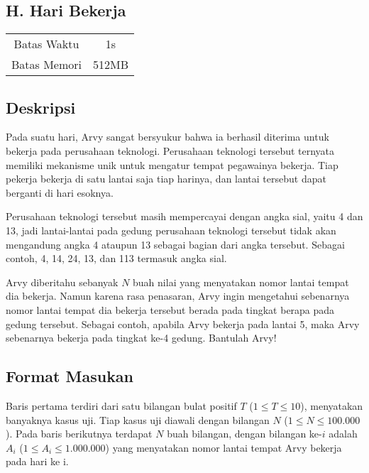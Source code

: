 \documentclass{article}
\begin{document}
\begin{center}
    \section*{H. Hari Bekerja}

    \begin{tabular}{ | c c | }
        \hline
        Batas Waktu  & 1s \\
        Batas Memori & 512MB \\
        \hline
    \end{tabular}
\end{center}

\subsection*{Deskripsi}

Pada suatu hari, Arvy sangat bersyukur bahwa ia berhasil diterima untuk bekerja pada perusahaan teknologi.
Perusahaan teknologi tersebut ternyata memiliki mekanisme unik untuk mengatur tempat pegawainya bekerja.
Tiap pekerja bekerja di satu lantai saja tiap harinya, dan lantai tersebut dapat berganti di hari esoknya.

Perusahaan teknologi tersebut masih mempercayai dengan angka sial, yaitu 4 dan 13, jadi lantai-lantai pada gedung perusahaan teknologi tersebut tidak akan mengandung angka 4 ataupun 13 sebagai bagian dari angka tersebut.
Sebagai contoh, 4, 14, 24, 13, dan 113 termasuk angka sial.

Arvy diberitahu sebanyak $N$ buah nilai yang menyatakan nomor lantai tempat dia bekerja.
Namun karena rasa penasaran, Arvy ingin mengetahui sebenarnya nomor lantai tempat dia bekerja tersebut berada pada tingkat berapa pada gedung tersebut.
Sebagai contoh, apabila Arvy bekerja pada lantai 5, maka Arvy sebenarnya bekerja pada tingkat ke-4 gedung.
Bantulah Arvy!

\subsection*{Format Masukan}

Baris pertama terdiri dari satu bilangan bulat positif $T$ ($1 \leq T \leq 10$), menyatakan banyaknya kasus uji.
Tiap kasus uji diawali dengan bilangan $N$ ($1 \leq N \leq 100.000$).
Pada baris berikutnya terdapat $N$ buah bilangan, dengan bilangan ke-$i$ adalah $A_i$ ($1 \leq A_i \leq 1.000.000$) yang menyatakan nomor lantai tempat Arvy bekerja pada hari ke i.
\end{document}
